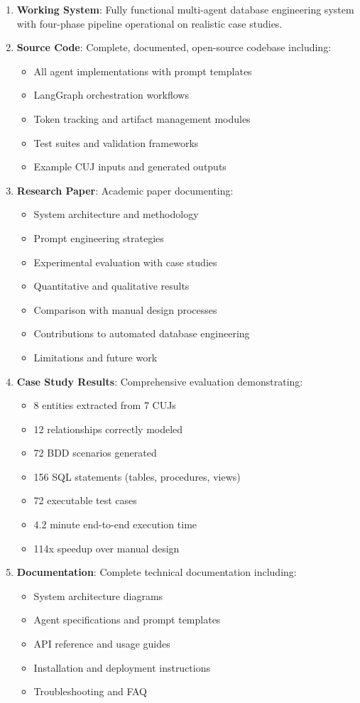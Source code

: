 \documentclass[12pt,a4paper]{article}
\begin{document}
\begin{enumerate}
\item \textbf{Working System}: Fully functional multi-agent database engineering system with four-phase pipeline operational on realistic case studies.

\item \textbf{Source Code}: Complete, documented, open-source codebase including:
\begin{itemize}
\item All agent implementations with prompt templates
\item LangGraph orchestration workflows
\item Token tracking and artifact management modules
\item Test suites and validation frameworks
\item Example CUJ inputs and generated outputs
\end{itemize}

\item \textbf{Research Paper}: Academic paper documenting:
\begin{itemize}
\item System architecture and methodology
\item Prompt engineering strategies
\item Experimental evaluation with case studies
\item Quantitative and qualitative results
\item Comparison with manual design processes
\item Contributions to automated database engineering
\item Limitations and future work
\end{itemize}

\item \textbf{Case Study Results}: Comprehensive evaluation demonstrating:
\begin{itemize}
\item 8 entities extracted from 7 CUJs
\item 12 relationships correctly modeled
\item 72 BDD scenarios generated
\item 156 SQL statements (tables, procedures, views)
\item 72 executable test cases
\item 4.2 minute end-to-end execution time
\item 114x speedup over manual design
\end{itemize}

\item \textbf{Documentation}: Complete technical documentation including:
\begin{itemize}
\item System architecture diagrams
\item Agent specifications and prompt templates
\item API reference and usage guides
\item Installation and deployment instructions
\item Troubleshooting and FAQ
\end{itemize}
\end{enumerate}
\end{document}
